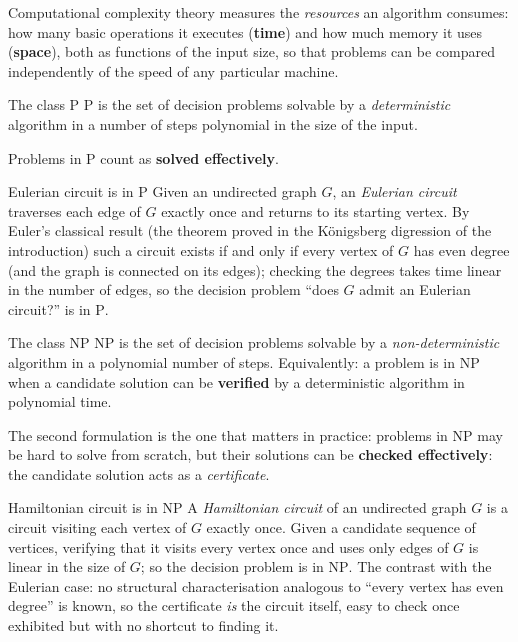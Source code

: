 Computational complexity theory measures the \emph{resources} an algorithm consumes: how many basic operations it executes (\textbf{time}) and how much memory it uses (\textbf{space}), both as functions of the input size, so that problems can be compared independently of the speed of any particular machine.
\begin{definitionbox}{The class $\mathrm{P}$}
$\mathrm{P}$ is the set of decision problems solvable by a \emph{deterministic} algorithm in a number of steps polynomial in the size of the input.
\end{definitionbox}
Problems in $\mathrm{P}$ count as \textbf{solved effectively}.
\begin{examplebox}{Eulerian circuit is in $\mathrm{P}$}
Given an undirected graph $G$, an \emph{Eulerian circuit} traverses each edge of $G$ exactly once and returns to its starting vertex. By Euler's classical result (the theorem proved in the K\"onigsberg digression of the introduction) such a circuit exists if and only if every vertex of $G$ has even degree (and the graph is connected on its edges); checking the degrees takes time linear in the number of edges, so the decision problem ``does $G$ admit an Eulerian circuit?'' is in $\mathrm{P}$.
\end{examplebox}

\begin{definitionbox}{The class $\mathrm{NP}$}
$\mathrm{NP}$ is the set of decision problems solvable by a \emph{non-deterministic} algorithm in a polynomial number of steps. Equivalently: a problem is in $\mathrm{NP}$ when a candidate solution can be \textbf{verified} by a deterministic algorithm in polynomial time.
\end{definitionbox}
The second formulation is the one that matters in practice: problems in $\mathrm{NP}$ may be hard to solve from scratch, but their solutions can be \textbf{checked effectively}: the candidate solution acts as a \emph{certificate}.
\begin{examplebox}{Hamiltonian circuit is in $\mathrm{NP}$}
A \emph{Hamiltonian circuit} of an undirected graph $G$ is a circuit visiting each vertex of $G$ exactly once. Given a candidate sequence of vertices, verifying that it visits every vertex once and uses only edges of $G$ is linear in the size of $G$; so the decision problem is in $\mathrm{NP}$. The contrast with the Eulerian case: no structural characterisation analogous to ``every vertex has even degree'' is known, so the certificate \emph{is} the circuit itself, easy to check once exhibited but with no shortcut to finding it.
\end{examplebox}

